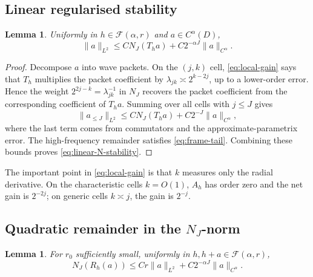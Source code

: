 \documentclass[11pt,a4paper]{article}
\newtheorem{lemma}[theorem]{Lemma}
\theoremstyle{remark}
\numberwithin{equation}{section}
\newcommand{\Fcal}{\mathcal F}
\begin{document}
\subsection{Linear regularised stability}

\begin{lemma}\label{lem:linear-N-stability}
Uniformly in $h\in\Fcal(\alpha,r)$ and $a\in C^\alpha(D)$,
\begin{equation}\label{eq:linear-N-stability}
\|a\|_{L^2}
\leq
CN_J(T_ha)+C2^{-\alpha J}\|a\|_{C^\alpha}.
\end{equation}
\end{lemma}

\begin{proof}
Decompose $a$ into wave packets. On the $(j,k)$ cell,
\eqref{eq:local-gain} says that $T_h$ multiplies the packet coefficient by
$\lambda_{jk}\asymp 2^{k-2j}$, up to a lower-order error. Hence the weight
$2^{2j-k}=\lambda_{jk}^{-1}$ in $N_J$ recovers the packet coefficient from
the corresponding coefficient of $T_ha$. Summing over all cells with
$j\leq J$ gives
\[
\|a_{\leq J}\|_{L^2}
\leq
CN_J(T_ha)+C2^{-J}\|a\|_{C^\alpha},
\]
where the last term comes from commutators and the approximate-parametrix
error. The high-frequency remainder satisfies \eqref{eq:frame-tail}.
Combining these bounds proves \eqref{eq:linear-N-stability}.
\end{proof}

The important point in \eqref{eq:local-gain} is that $k$ measures only the
radial derivative. On the characteristic cells $k=O(1)$, $A_h$ has order
zero and the net gain is $2^{-2j}$; on generic cells $k\asymp j$, the gain
is $2^{-j}$.

\subsection{Quadratic remainder in the $N_J$-norm}

\begin{lemma}\label{lem:remainder-N}
For $r_0$ sufficiently small, uniformly in $h,h+a\in\Fcal(\alpha,r)$,
\begin{equation}\label{eq:remainder-N}
N_J(R_h(a))
\leq
Cr\|a\|_{L^2}
+
C2^{-\alpha J}\|a\|_{C^\alpha}.
\end{equation}
\end{lemma}
\end{document}
